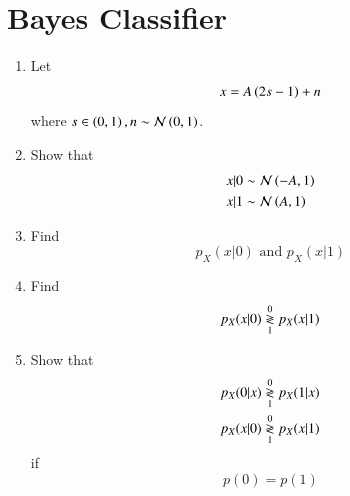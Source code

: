 \documentclass[journal,12pt,twocolumn]{IEEEtran}
\renewcommand\thesection{\arabic{section}}
\begin{document}
%
\section{Bayes Classifier}
\begin{enumerate}[label=\thesection.\arabic*
,ref=\thesection.\theenumi]
%
\item Let
%
\begin{align}
x = A\left(2s-1\right) + n
\end{align}
%
where $s \in \left(0,1\right), n \sim \mathcal{N}\left(0,1\right)$.

\item Show that
\begin{align}
x|0  &\sim \mathcal{N}\left(-A,1\right)
\\
x|1 &\sim \mathcal{N}\left(A,1\right)
\end{align}

\item Find
\begin{equation}
p_{X}(x|0)\text{ and } p_{X}(x|1)
\end{equation}
\item Find
\begin{equation}
p_{X}(x|0) \overset{0}{\underset{1}{\gtrless}} p_{X}(x|1)
\end{equation}
%
\item Show that 
\begin{align}
p_{X}(0|x) \overset{0}{\underset{1}{\gtrless}} p_{X}(1|x)
\\
p_{X}(x|0) \overset{0}{\underset{1}{\gtrless}} p_{X}(x|1)
\end{align}
if
\begin{equation}
p(0)=p(1)
\end{equation}
%
\end{enumerate}
\end{document}
